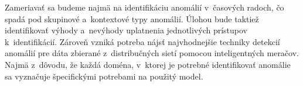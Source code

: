 \documentclass[a4paper,twoside,slovak,12pt]{article}
\begin{document}
Zameriavať sa budeme najmä na identifikáciu anomálií v~časových radoch, čo spadá
pod skupinové a~kontextové typy anomálií. Úlohou bude taktiež identifikovať
výhody a~nevýhody uplatnenia jednotlivých prístupov k~identifikácií. Zároveň
vzniká potreba nájsť najvhodnejšie techniky detekcií anomálií pre dáta zbierané
z~distribučných sietí pomocou inteligentných meračov. Najmä z~dôvodu, že každá
doména, v~ktorej je potrebné identifikovať anomálie sa vyznačuje špecifickými
potrebami na použitý model.



\newpage


\end{document}
